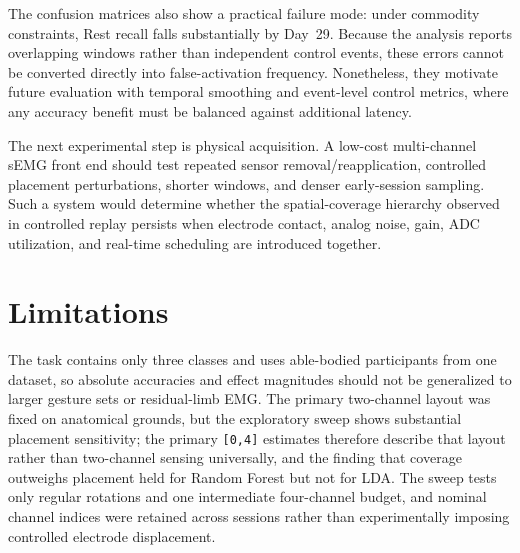 \documentclass[preprint,12pt]{elsarticle}
\begin{document}
The confusion matrices also show a practical failure mode: under commodity constraints, Rest recall falls substantially by Day~29. Because the analysis reports overlapping windows rather than independent control events, these errors cannot be converted directly into false-activation frequency. Nonetheless, they motivate future evaluation with temporal smoothing and event-level control metrics, where any accuracy benefit must be balanced against additional latency.

The next experimental step is physical acquisition. A low-cost multi-channel sEMG front end should test repeated sensor removal/reapplication, controlled placement perturbations, shorter windows, and denser early-session sampling. Such a system would determine whether the spatial-coverage hierarchy observed in controlled replay persists when electrode contact, analog noise, gain, ADC utilization, and real-time scheduling are introduced together.

\section{Limitations}
The task contains only three classes and uses able-bodied participants from one dataset, so absolute accuracies and effect magnitudes should not be generalized to larger gesture sets or residual-limb EMG. The primary two-channel layout was fixed on anatomical grounds, but the exploratory sweep shows substantial placement sensitivity; the primary \texttt{[0,4]} estimates therefore describe that layout rather than two-channel sensing universally, and the finding that coverage outweighs placement held for Random Forest but not for LDA. The sweep tests only regular rotations and one intermediate four-channel budget, and nominal channel indices were retained across sessions rather than experimentally imposing controlled electrode displacement.
\end{document}
